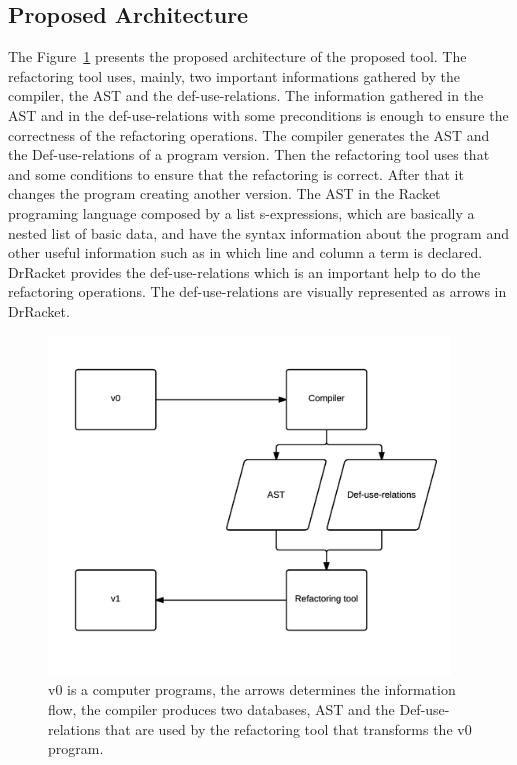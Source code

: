 \subsection{Proposed Architecture}

The Figure~\ref{fig:architecture} presents the proposed architecture of the proposed tool. 
The refactoring tool uses, mainly, two important informations gathered by the compiler, the AST and the def-use-relations.
The information gathered in the AST and in the def-use-relations with some preconditions is enough to ensure the correctness of the refactoring operations.
The compiler generates the AST and the Def-use-relations of a program version. Then the refactoring tool uses that and some conditions to ensure that the refactoring is correct. After that it changes the program creating another version.
The AST in the Racket programing language composed by a list s-expressions, which are basically a nested list of basic data, and have the syntax information about the program and other useful information such as in which line and column a term is declared.
DrRacket provides the def-use-relations which is an important help to do the refactoring operations. The def-use-relations are visually represented as arrows in DrRacket.

\begin{figure}[htbp]
	\centering
	\includegraphics[width=0.95\textwidth]{img/arquitectura.png}
	\caption{v0 is a computer programs, the arrows determines the information flow, the compiler produces two databases, AST and the Def-use-relations that are used by the refactoring tool that transforms the v0 program.}
	\label{fig:architecture}
\end{figure}


